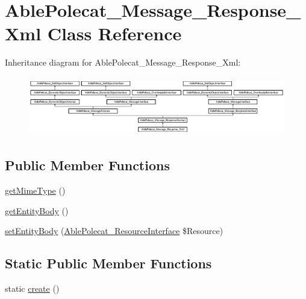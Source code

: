 \hypertarget{class_able_polecat___message___response___xml}{}\section{Able\+Polecat\+\_\+\+Message\+\_\+\+Response\+\_\+\+Xml Class Reference}
\label{class_able_polecat___message___response___xml}
Inheritance diagram for Able\+Polecat\+\_\+\+Message\+\_\+\+Response\+\_\+\+Xml\+:\begin{figure}[H]
\begin{center}
\leavevmode
\includegraphics[height=2.604651cm]{class_able_polecat___message___response___xml}
\end{center}
\end{figure}
\subsection*{Public Member Functions}
\begin{DoxyCompactItemize}
\item 
\hyperlink{class_able_polecat___message___response___xml_ac06e9f7b10fca30eb41e41d4dc108b1c}{get\+Mime\+Type} ()
\item 
\hyperlink{class_able_polecat___message___response___xml_a0841bf6c2f3e1f97f8c789475ee95b05}{get\+Entity\+Body} ()
\item 
\hyperlink{class_able_polecat___message___response___xml_a858ab2a95af7d312509c203de5c6fb11}{set\+Entity\+Body} (\hyperlink{interface_able_polecat___resource_interface}{Able\+Polecat\+\_\+\+Resource\+Interface} \$Resource)
\end{DoxyCompactItemize}
\subsection*{Static Public Member Functions}
\begin{DoxyCompactItemize}
\item 
static \hyperlink{class_able_polecat___message___response___xml_a239b1c70258014a86569483c2d009de6}{create} ()
\end{DoxyCompactItemize}
